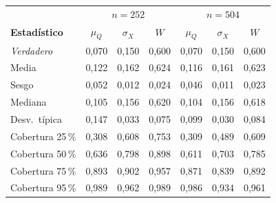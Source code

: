 {\footnotesize
\renewcommand{\arraystretch}{1.18}
\begin{tabular}{l|ccc|ccc}
\hline
\multicolumn{1}{c}{} & \multicolumn{3}{c}{$n=252$} & \multicolumn{3}{c}{$n=504$} \\
\textbf{Estad\'istico} & $\mu_Q$ & $\sigma_X$ & $W$ & $\mu_Q$ & $\sigma_X$ & $W$ \\
\hline
\textit{Verdadero} & 0,070 & 0,150 & 0,600 & 0,070 & 0,150 & 0,600 \\
\hline
Media & 0,122 & 0,162 & 0,624 & 0,116 & 0,161 & 0,623 \\
Sesgo & 0,052 & 0,012 & 0,024 & 0,046 & 0,011 & 0,023 \\
Mediana & 0,105 & 0,156 & 0,620 & 0,104 & 0,156 & 0,618 \\
Desv.\ t\'ipica & 0,147 & 0,033 & 0,075 & 0,099 & 0,030 & 0,084 \\
\hline
Cobertura 25\,\% & 0,308 & 0,608 & 0,753 & 0,309 & 0,489 & 0,609 \\
Cobertura 50\,\% & 0,636 & 0,798 & 0,898 & 0,611 & 0,703 & 0,785 \\
Cobertura 75\,\% & 0,893 & 0,902 & 0,957 & 0,871 & 0,839 & 0,892 \\
Cobertura 95\,\% & 0,989 & 0,962 & 0,989 & 0,986 & 0,934 & 0,961 \\
\hline
\end{tabular}}